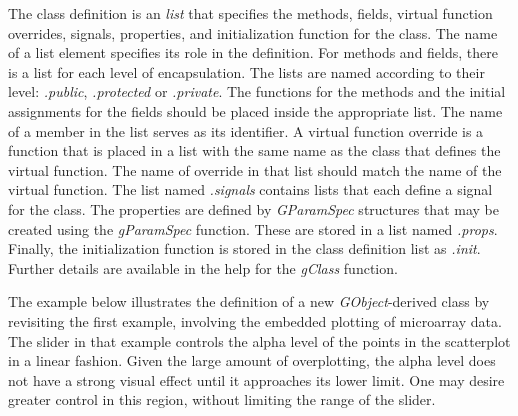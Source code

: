 \documentclass[article]{jss}
\begin{document}
The class definition is an  \emph{list} that specifies the
methods, fields, virtual function overrides, signals, properties, and
initialization function for the class. The name of a list element specifies
its role in the definition. For methods and fields, there is a 
list for each level of encapsulation. The lists are named
according to their level: \emph{.public}, \emph{.protected} or \emph{.private}. 
The functions for the methods and the initial assignments for the fields should
be placed inside the appropriate list. The name of a member in the list 
serves as its identifier. A virtual function override is a function that is 
placed in a list with the same name as the class that defines the virtual 
function. The name of override in that list should match the name of the virtual 
function. The list named \emph{.signals} contains lists that each define
a signal for the class. The properties are defined by \emph{GParamSpec}
structures that may be created using the \emph{gParamSpec} function. These
are stored in a list named \emph{.props}. Finally, the initialization function
is stored in the class definition list as \emph{.init}. Further details
are available in the  help for the \emph{gClass} function.

The example below illustrates the definition of a new \emph{GObject}-derived
class by revisiting the first example, involving the embedded plotting of 
microarray data. The slider in that example controls the alpha level of the
points in the scatterplot in a linear fashion. Given the large amount of
overplotting, the alpha level does not have a strong visual effect until it
approaches its lower limit. One may desire greater control in this region,
without limiting the range of the slider. 
\end{document}
